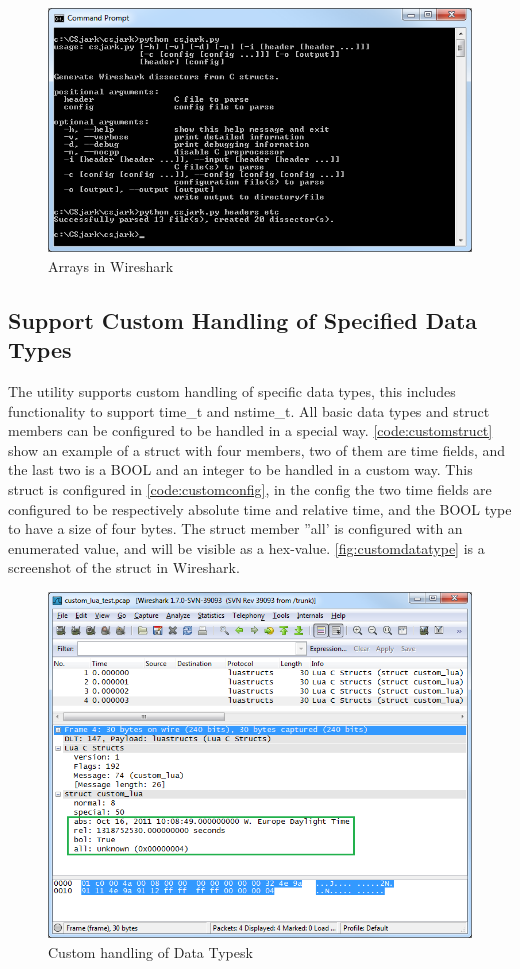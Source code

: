 \begin{figure}[ht]
	\center
	\includegraphics[width=\textwidth]{./sprints/img/csjark_folder}
	\caption{Arrays in Wireshark\label{fig:csjarkfolder}}
\end{figure}

\subsection{Support Custom Handling of Specified Data Types}
The utility supports custom handling of specific data types, this includes 
functionality to support  time\_t and nstime\_t. All basic data types and 
struct members can be configured to be handled in a special way. 
\autoref{code:customstruct} show an example of a struct with four members, two 
of them are time fields, and the last two is a BOOL and an integer to be 
handled in a custom way. This struct is configured in 
\autoref{code:customconfig}, in the config the two time fields are configured 
to be respectively absolute time and relative time, and the BOOL type to have 
a size of four bytes. The struct member ''all' is configured with an enumerated 
value, and will be visible as a hex-value. \autoref{fig:customdatatype} is a 
screenshot of the struct in Wireshark.

\begin{figure}[ht]
	\center
	\includegraphics[width=\textwidth]{./sprints/img/wireshark_custom}
	\caption{Custom handling of Data Typesk\label{fig:customdatatype}}
\end{figure}

